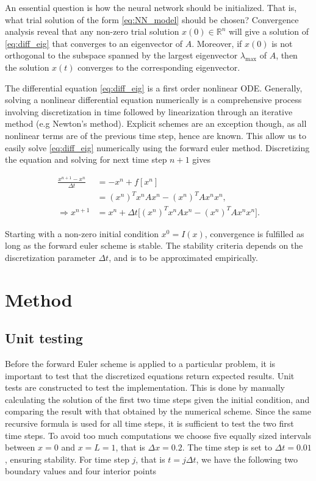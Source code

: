 \documentclass[12pt]{extarticle}
\begin{document}
An essential question is how the neural network should be initialized. That is, what trial solution of the form \eqref{eq:NN_model} should be chosen? Convergence analysis reveal that any non-zero trial solution $x(0) \in \mathbb{R}^n$ will give a solution of \eqref{eq:diff_eig} that converges to an eigenvector of $A$. Moreover, if $x(0)$ is not orthogonal to the subspace spanned by the largest eigenvector $\lambda_{\mathrm{max}}$ of $A$, then the solution $x(t)$ converges to the corresponding eigenvector.

The differential equation \eqref{eq:diff_eig} is a first order nonlinear ODE. Generally, solving a nonlinear differential equation numerically is a comprehensive process involving discretization in time followed by linearization through an iterative method (e.g Newton's method). Explicit schemes are an exception though, as all nonlinear terms are of the previous time step, hence are known. This allow us to easily solve \eqref{eq:diff_eig} numerically using the forward euler method. Discretizing the equation and solving for next time step $n+1$ gives

\begin{align}
	\frac{x^{n+1}-x^n}{\Delta t} &= -x^n + f[x^n] \nonumber \\
	&= (x^n)^T x^n A x^n - (x^n)^T A x^n x^n, \\
	\Rightarrow x^{n+1} &= x^n + \Delta t\big[ (x^n)^T x^n A x^n - (x^n)^T A x^n x^n \big].
\end{align}

Starting with a non-zero initial condition $x^0 = I(x)$, convergence is fulfilled as long as the forward euler scheme is stable. The stability criteria depends on the discretization parameter $\Delta t$, and is to be approximated empirically. 



\section{Method}
\subsection{Unit testing}

Before the forward Euler scheme is applied to a particular problem, it is important to test that the discretized equations return expected results. Unit tests are constructed to test the implementation. This is done by manually calculating the solution of the first two time steps given the initial condition, and comparing the result with that obtained by the numerical scheme. Since the same recursive formula is used for all time steps, it is sufficient to test the two first time steps. To avoid too much computations we choose five equally sized intervals between $x=0$ and $x=L=1$, that is $\Delta x = 0.2$. The time step is set to $\Delta t = 0.01$, ensuring stability.
For time step $j$, that is $t=j\Delta t$, we have the following two boundary values and four interior points
\end{document}
